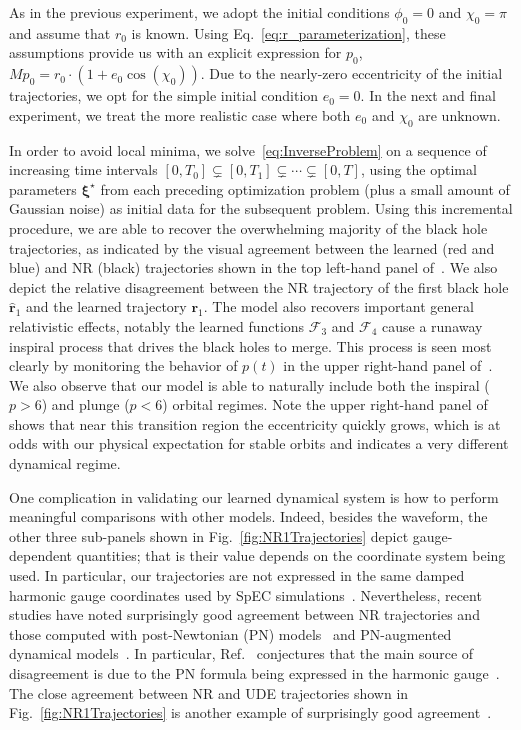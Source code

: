 \documentclass[ reprint,
nofootinbib,
 amsmath,amssymb,
 aps,
]{revtex4-2}
\begin{document}
As in the previous experiment, we adopt the initial conditions $\phi_0 = 0$ and $\chi_0 = \pi$
and assume  that $r_0$ is known.
Using Eq.~\eqref{eq:r_parameterization}, these assumptions provide us with an explicit expression for $p_0$, $M p_0 = r_0\cdot(1+e_0\cos(\chi_0))$.
Due to the nearly-zero eccentricity of the initial trajectories, we opt for the simple initial condition $e_0 = 0$.
In the next and final experiment, we treat the more realistic case where both $e_0$ and $\chi_0$ are unknown.


In order to avoid local minima, we solve~\cref{eq:InverseProblem} on a sequence of increasing time intervals $[0,T_0] \subsetneq [0,T_1] \subsetneq \cdots \subsetneq [0,T]$, using the optimal parameters $\bm{\xi}^\star$ from each preceding optimization problem (plus a small amount of Gaussian noise) as initial data for the subsequent problem.
Using this incremental procedure, we are able to recover the overwhelming majority of the black hole trajectories, as indicated by the visual agreement between the learned (red and blue) and NR (black) trajectories shown in the top left-hand panel of~. We also depict the relative disagreement between the NR trajectory of the first black hole $\hat{\mathbf{r}}_1$ and the learned trajectory ${\mathbf{r}}_1$. The model also recovers important general
relativistic effects, notably the learned functions $\mathcal{F}_3$ and $\mathcal{F}_4$ cause a 
runaway inspiral process that drives the black holes to merge.
This process is seen most clearly by monitoring the behavior of $p(t)$
in the upper right-hand panel of~.
We also observe that our model is able to naturally include both the inspiral ($p > 6$)
and plunge ($p< 6$) orbital regimes. Note the upper right-hand panel of~ shows 
that near this transition region the eccentricity quickly grows, which is at odds with 
our physical expectation for stable orbits and indicates a very different dynamical regime.

One complication in validating our learned dynamical system is how to perform meaningful comparisons with other models. Indeed, besides the waveform, the other three sub-panels shown in Fig.~\ref{fig:NR1Trajectories} depict gauge-dependent quantities; that is their value depends on the coordinate system being used. In particular, our trajectories are not expressed in 
the same damped harmonic gauge coordinates used by SpEC simulations~\cite{szilagyi2009simulations}. Nevertheless, recent studies have noted surprisingly good agreement between NR trajectories and those computed with post-Newtonian (PN) models~\cite{boyle2014gravitational} and PN-augmented dynamical models~\cite{varma2019binary,blackman2017surrogate,blackman2017numerical}. In particular, Ref.~\cite{varma2019binary} conjectures that the main source of disagreement is due to the PN formula being expressed in the harmonic gauge~\cite{blanchet2014gravitational}. The close agreement between NR and UDE trajectories shown in Fig.~\ref{fig:NR1Trajectories} is another example of surprisingly good agreement~\cite{varma2019binary,boyle2014gravitational}.
\end{document}
